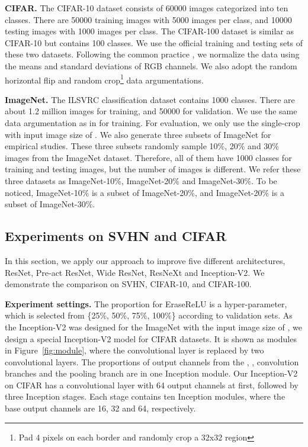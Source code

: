 \documentclass[10pt,twocolumn,letterpaper]{article}
\begin{document}
\textbf{CIFAR.}
The CIFAR-10 dataset consists of 60000 images categorized into ten classes.
There are 50000 training images with 5000 images per class, and 10000 testing images with 1000 images per class.
The CIFAR-100 dataset is similar as CIFAR-10 but contains 100 classes. We use the official training and testing sets of these two datasets.
Following the common practice \cite{he2016deep,xie2017aggregated,huang2017densely}, we normalize the data using the means and standard deviations of RGB channels. We also adopt the random horizontal flip and random crop\footnote{Pad 4 pixels on each border and randomly crop a 32x32 region} data argumentations.

\textbf{ImageNet.}
The ILSVRC classification dataset contains 1000 classes. There are about 1.2 million images for training, and 50000 for validation. We use the same data argumentation as in \cite{xie2017aggregated,huang2017densely} for training. For evaluation, we only use the single-crop with input image size of .
We also generate three subsets of ImageNet for empirical studies. These three subsets randomly sample 10\%, 20\% and 30\% images from the ImageNet dataset. Therefore, all of them have 1000 classes for training and testing images, but the number of images is different. We refer these three datasets as ImageNet-10\%, ImageNet-20\% and ImageNet-30\%. To be noticed, ImageNet-10\% is a subset of ImageNet-20\%, and ImageNet-20\% is a subset of ImageNet-30\%.




\subsection{Experiments on SVHN and CIFAR}

In this section, we apply our approach to improve five different architectures, ResNet, Pre-act ResNet, Wide ResNet, ResNeXt and Inception-V2.
We demonstrate the comparison on SVHN, CIFAR-10, and CIFAR-100.

{\bf Experiment settings.}
The proportion for EraseReLU is a hyper-parameter, which is selected from \{25\%, 50\%, 75\%, 100\%\} according to validation sets.
As the Inception-V2 was designed for the ImageNet with the input image size of , we design a special Inception-V2 model for CIFAR datasets. It is shown as modules in Figure~\ref{fig:module}, where the  convolutional layer is replaced by two  convolutional layers.
The proportions of output channels from the , ,  convolution branches and the pooling branch are  in one Inception module.
Our Inception-V2 on CIFAR has a convolutional layer with 64 output channels at first, followed by three Inception stages. Each stage contains ten Inception modules, where the base output channels are 16, 32 and 64, respectively.
\end{document}
